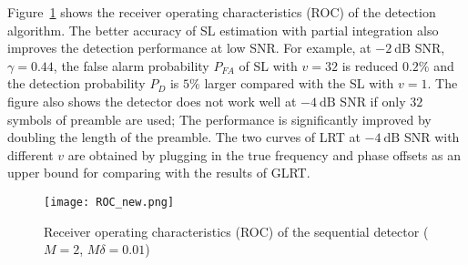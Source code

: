 Figure~\ref{fig:Receiver operating characteristics} shows the receiver
operating characteristics (ROC) of the detection algorithm. 
The better accuracy of SL estimation with partial integration also
improves the detection performance  at low SNR.
For example, at $\SI{-2}{\dB}$ SNR, $\gamma=0.44$, the false alarm probability $P_{FA}$ of SL with $v=32$ is reduced $0.2\%$ and 
the detection probability $P_{D}$ is $5\%$ larger compared with the SL with $v{=}1$. 
The figure also shows the detector does not work well at $\SI{-4}{\dB}$ SNR if only $32$ symbols of preamble are used;  
The performance is significantly improved by doubling the length of
the preamble. The two curves of LRT at $\SI{-4}{\dB}$ SNR with different $v$
are obtained by plugging in the true frequency and phase offsets as an upper bound for comparing with 
the results of GLRT.   

\begin{figure}[t]
  \centerline{\texttt{[image: ROC\_new.png]}}
  \caption{Receiver operating characteristics (ROC) of the sequential detector ($M=2$, $M\delta=0.01$)}
  \label{fig:Receiver operating characteristics}
\end{figure}

